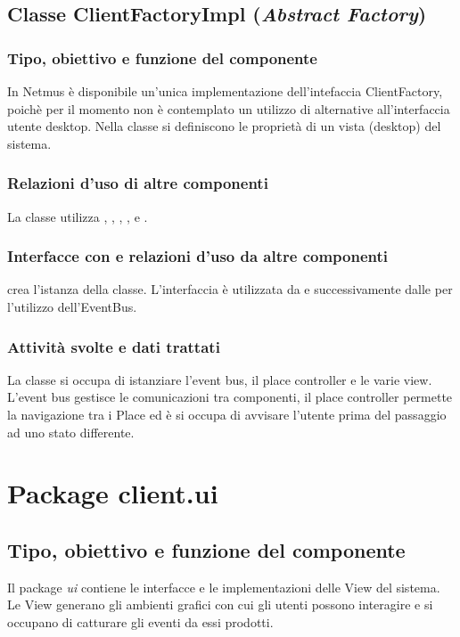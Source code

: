 \subsection{Classe ClientFactoryImpl (\emph{Abstract Factory})}
\subsubsection*{Tipo, obiettivo e funzione del componente}
In Netmus \`e disponibile un'unica implementazione dell'intefaccia
ClientFactory, poich\`e per il momento non \`e contemplato un utilizzo di
alternative all'interfaccia utente desktop.
Nella classe si definiscono le propriet\`a di un vista (desktop) del
sistema.

\subsubsection*{Relazioni d'uso di altre componenti}
La classe utilizza , , ,
,  e
.
\subsubsection*{Interfacce con e relazioni d'uso da altre componenti}
 crea l'istanza della classe. L'interfaccia  \`e
utilizzata da  e successivamente dalle  per
l'utilizzo dell'EventBus.
\subsubsection*{Attivit\`a svolte e dati trattati}
La classe si occupa di istanziare l'event bus, il place controller e le varie
view. L'event bus gestisce le comunicazioni tra componenti, il place
controller permette la navigazione tra i Place ed \`e si occupa di avvisare
l'utente prima del passaggio ad uno stato differente.


\newpage
\section{Package client.ui} %
\subsection*{Tipo, obiettivo e funzione del componente}
Il package \emph{ui} contiene le interfacce e le implementazioni delle View del
sistema. Le View generano gli ambienti grafici con cui gli utenti possono
interagire e si occupano di catturare gli eventi da essi prodotti.

